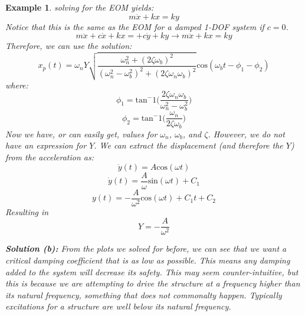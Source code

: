 \documentclass[12pt,letter]{article}
\newtheorem{ex}{Example}
\numberwithin{ex}{section} %
\newenvironment{example}{\begin{mdframed}[middlelinewidth=0.5mm]\begin{ex}\normalfont}{\end{ex}\end{mdframed}}
\numberwithin{re}{section} %
\begin{document}
\begin{example}
			solving for the EOM yields:
			\begin{equation}
				m\ddot{x} + kx = ky
			\end{equation} 				
			Notice that this is the same as the EOM for a damped 1-DOF system if $c=0$.	
			\begin{equation}
			m\ddot{x} + c\dot{x} + kx = + c\dot{y} + ky \rightarrow m\ddot{x} + kx = ky
			\end{equation}
			Therefore, we can use the solution:
			\begin{equation}
				x_p(t) = 	\omega_n Y   \sqrt{\frac{\omega_n^2 + (2 \zeta \omega_b)^2 }{(\omega_n^2 - \omega_b^2)^2 +  (2\zeta \omega_n \omega_b)^2} }  \text{cos}(\omega_bt - \phi_1 - \phi_2)
			\end{equation}
			where:
			\begin{equation}
				\phi_1 = \text{tan}^-1\bigg(\frac{2\zeta \omega_n \omega_b}{\omega_n^2 - \omega_b^2}\bigg)
			\end{equation}	
			\begin{equation}
				\phi_2 = \text{tan}^-1\bigg(\frac{\omega_n}{2\zeta \omega_b}\bigg)
			\end{equation}
			Now we have, or can easily get, values for $\omega_n$, $\omega_b$, and $\zeta$. However, we do not have an expression for $Y$. We can extract the displacement (and therefore the $Y$) from the acceleration as:
			\begin{equation}
				\ddot{y}(t) = A \text{cos}(\omega t)
			\end{equation} 				
			\begin{equation}
				\dot{y}(t) = \frac{A}{\omega} \text{sin}(\omega t) + C_1
			\end{equation} 					
			\begin{equation}
				y(t) = - \frac{A}{\omega^2} \text{cos}(\omega t) + C_1t + C_2
			\end{equation} 					
			Resulting in 
			\begin{equation}
				Y = -\frac{A}{\omega^2}
			\end{equation} 			
			
			\noindent\textbf{Solution (b):} From the plots we solved for before, we can see that we want a critical damping coefficient that is as low as possible. This means any damping added to the system will decrease its safety. This may seem counter-intuitive, but this is because we are attempting to drive the structure at a frequency higher than its natural frequency, something that does not commonalty happen. Typically excitations for a structure are well below its natural frequency.  			
			
\end{example}			
	
\end{document}
